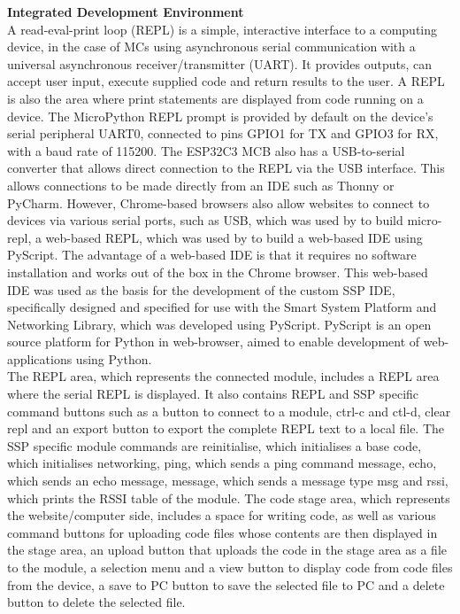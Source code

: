 \textbf{\label{sec:methods_ide}Integrated Development Environment}\\

A read-eval-print loop (REPL) is a simple, interactive interface to a computing device, in the case of MCs using asynchronous serial communication with a universal asynchronous receiver/transmitter (UART). It provides outputs, can accept user input, execute supplied code and return results to the user. A REPL is also the area where print statements are displayed from code running on a device. The MicroPython REPL prompt is provided by default on the device's serial peripheral UART0, connected to pins GPIO1 for TX and GPIO3 for RX, with a baud rate of 115200. \citep{micropython_micropython_2025} The ESP32C3 MCB also has a USB-to-serial converter that allows direct connection to the REPL via the USB interface. This allows connections to be made directly from an IDE such as Thonny or PyCharm. However, Chrome-based browsers also allow websites to connect to devices via various serial ports, such as USB, which was used by \citet{webreflection_micro-repl_nodate} to build micro-repl, a web-based REPL, which was used by \citet[]{rogers_serial_nodate} to build a web-based IDE using PyScript. The advantage of a web-based IDE is that it requires no software installation and works out of the box in the Chrome browser. This web-based IDE was used as the basis for the development of the custom SSP IDE, specifically designed and specified for use with the Smart System Platform and Networking Library, which was developed using PyScript. PyScript is an open source platform for Python in web-browser, aimed to enable development of web-applications using Python. \citep{anaconda_inc_pyscript_2025,anaconda_inc_pyscript_nodate,anaconda_inc_pyscriptnet_nodate}\\

The REPL area, which represents the connected module, includes a REPL area where the serial REPL is displayed. It also contains REPL and SSP specific command buttons such as a button to connect to a module, ctrl-c and ctl-d, clear repl and an export button to export the complete REPL text to a local file. The SSP specific module commands are reinitialise, which initialises a base code, which initialises networking, ping, which sends a ping command message, echo, which sends an echo message, message, which sends a message type msg and rssi, which prints the RSSI table of the module. 
The code stage area, which represents the website/computer side, includes a space for writing code, as well as various command buttons for uploading code files whose contents are then displayed in the stage area, an upload button that uploads the code in the stage area as a file to the module, a selection menu and a view button to display code from code files from the device, a save to PC button to save the selected file to PC and a delete button to delete the selected file.

